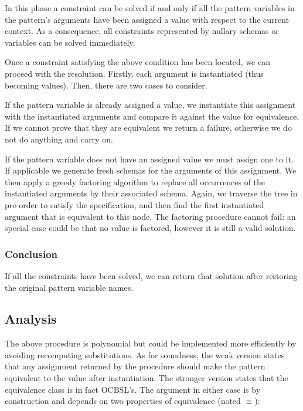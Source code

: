 In this phase a constraint can be solved if and only if all the pattern variables in the pattern's arguments have been assigned a value with respect to the current context. As a consequence, all constraints represented by nullary schemas or variables can be solved immediately.

Once a constraint satisfying the above condition has been located, we can proceed with the resolution. Firstly, each argument is instantiated (thus becoming values). Then, there are two cases to consider.

If the pattern variable is already assigned a value, we instantiate this assignment with the instantiated arguments and compare it against the value for equivalence. If we cannot prove that they are equivalent we return a failure, otherwise we do not do anything and carry on.

If the pattern variable does not have an assigned value we must assign one to it. If applicable we generate fresh schemas for the arguments of this assignment. We then apply a greedy factoring algorithm to replace all occurrences of the instantiated arguments by their associated schema. Again, we traverse the tree in pre-order to satisfy the specification, and then find the first instantiated argument that is equivalent to this node. The factoring procedure cannot fail: an special case could be that no value is factored, however it is still a valid solution.

\subsubsection{Conclusion}

If all the constraints have been solved, we can return that solution after restoring the original pattern variable names.

\subsection{Analysis}

The above procedure is polynomial but could be implemented more efficiently by avoiding recomputing substitutions. As for soundness, the weak version states that any assignment returned by the procedure should make the pattern equivalent to the value after instantiation. The stronger version states that the equivalence class is in fact OCBSL's. The argument in either case is by construction and depends on two properties of equivalence (noted $\equiv$):

